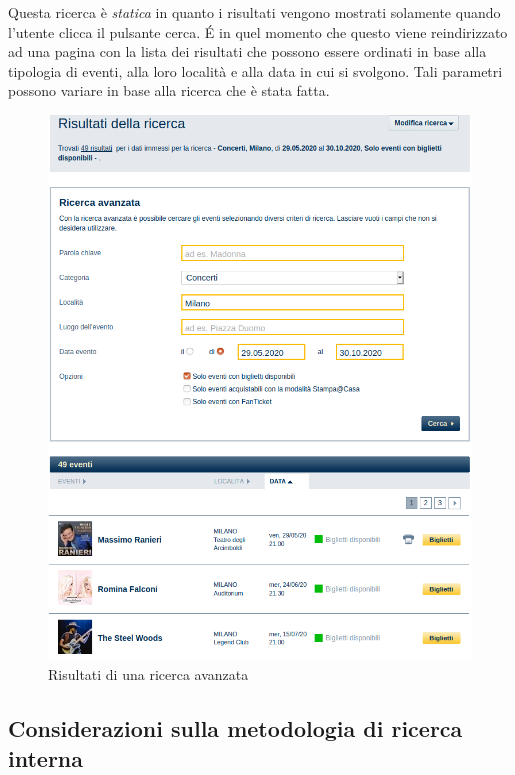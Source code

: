 	Questa ricerca è \textit{statica} in quanto i risultati vengono mostrati solamente quando l'utente clicca il pulsante cerca.
	\'E in quel momento che questo viene reindirizzato ad una pagina con la lista dei risultati che possono essere ordinati in base alla tipologia di eventi, alla loro località e alla data in cui si svolgono.
	Tali parametri possono variare in base alla ricerca che è stata fatta.
	
	\begin{figure}[hbt]
		\centering
		\includegraphics[width=\textwidth-.75cm]{img/ricerca_4.png}
		\caption{Risultati di una ricerca avanzata}
		\label{ricerca4}
	\end{figure}

\subsection{Considerazioni sulla metodologia di ricerca interna}

